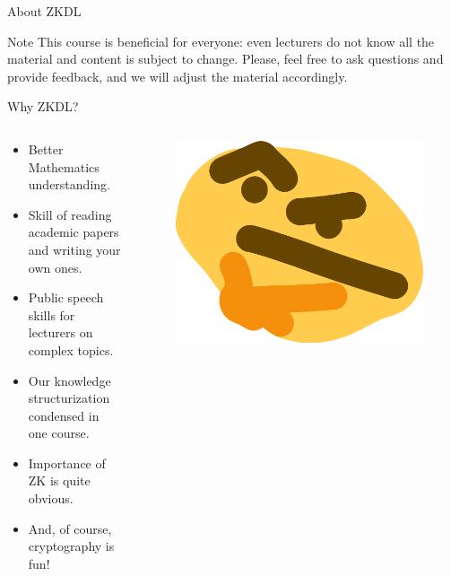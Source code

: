 \documentclass{beamer}
\begin{document}
\begin{frame}{About ZKDL}
       {
        \begin{alertblock}{Note}
          This course is beneficial for everyone: even lecturers do not know all the material and content is subject to change. Please, feel free to ask questions and provide feedback, and we will adjust the material accordingly.
        \end{alertblock}
      }
    \end{frame}

    \begin{frame}{Why ZKDL?}

      \begin{columns}
        \begin{column}{0.65\textwidth}
          \begin{itemize}
            \item Better Mathematics understanding.
            \item Skill of reading academic papers and writing your own ones.
            \item Public speech skills for lecturers on complex topics.
            \item Our knowledge structurization condensed in one course.
            \item Importance of ZK is quite obvious.
            \item And, of course, cryptography is fun!
          \end{itemize}
        \end{column}
        \begin{column}{0.35\textwidth}
            \begin{figure}
            \centering
                \includegraphics[width=\textwidth]{images/lecture_1/thonk.png}
            \end{figure}
        \end{column}
        \end{columns}
        

\end{frame}
\end{document}
